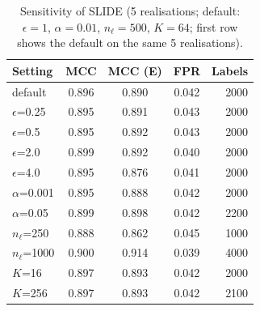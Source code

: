 \begin{table}[t]
\centering
\caption{Sensitivity of SLIDE (5 realisations; default: $\epsilon=1$, $\alpha=0.01$, $n_\ell=500$, $K=64$; first row shows the default on the same 5 realisations).}
\label{tab:sens}
\scriptsize
\begin{tabular}{@{}lcccr@{}}
\toprule
Setting & MCC & MCC (E) & FPR & Labels \\
\midrule
default & 0.896 & 0.890 & 0.042 & 2000 \\
$\epsilon$=0.25 & 0.895 & 0.891 & 0.043 & 2000 \\
$\epsilon$=0.5 & 0.895 & 0.892 & 0.043 & 2000 \\
$\epsilon$=2.0 & 0.899 & 0.892 & 0.040 & 2000 \\
$\epsilon$=4.0 & 0.895 & 0.876 & 0.041 & 2000 \\
$\alpha$=0.001 & 0.895 & 0.888 & 0.042 & 2000 \\
$\alpha$=0.05 & 0.899 & 0.898 & 0.042 & 2200 \\
$n_\ell$=250 & 0.888 & 0.862 & 0.045 & 1000 \\
$n_\ell$=1000 & 0.900 & 0.914 & 0.039 & 4000 \\
$K$=16 & 0.897 & 0.893 & 0.042 & 2000 \\
$K$=256 & 0.897 & 0.893 & 0.042 & 2100 \\
\bottomrule
\end{tabular}
\end{table}
